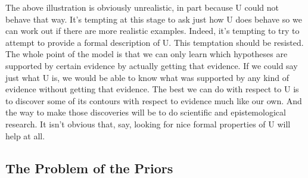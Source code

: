 \documentclass[
  10pt,
  letterpaper,
  DIV=11,
  numbers=noendperiod,
  twoside]{scrartcl}
\begin{document}
The above illustration is obviously unrealistic, in part because U could
not behave that way. It's tempting at this stage to ask just how U does
behave so we can work out if there are more realistic examples. Indeed,
it's tempting to try to attempt to provide a formal description of U.
This temptation should be resisted. The whole point of the model is that
we can only learn which hypotheses are supported by certain evidence by
actually getting that evidence. If we could say just what U is, we would
be able to know what was supported by any kind of evidence without
getting that evidence. The best we can do with respect to U is to
discover some of its contours with respect to evidence much like our
own. And the way to make those discoveries will be to do scientific and
epistemological research. It isn't obvious that, say, looking for nice
formal properties of U will help at all.

\subsection{The Problem of the Priors}\label{the-problem-of-the-priors}
\end{document}
